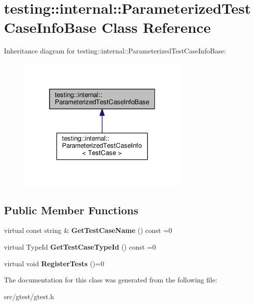 \hypertarget{classtesting_1_1internal_1_1_parameterized_test_case_info_base}{}\section{testing\+:\+:internal\+:\+:Parameterized\+Test\+Case\+Info\+Base Class Reference}
\label{classtesting_1_1internal_1_1_parameterized_test_case_info_base}


Inheritance diagram for testing\+:\+:internal\+:\+:Parameterized\+Test\+Case\+Info\+Base\+:
\nopagebreak
\begin{figure}[H]
\begin{center}
\leavevmode
\includegraphics[width=241pt]{classtesting_1_1internal_1_1_parameterized_test_case_info_base__inherit__graph}
\end{center}
\end{figure}
\subsection*{Public Member Functions}
\begin{DoxyCompactItemize}
\item 
\mbox{\label{classtesting_1_1internal_1_1_parameterized_test_case_info_base_a0c809cfb964cb9560d49ae830e2b6469}} 
virtual const string \& {\bfseries Get\+Test\+Case\+Name} () const =0
\item 
\mbox{\label{classtesting_1_1internal_1_1_parameterized_test_case_info_base_a932b4a9185a72d5bdfa5fd84fc06cbca}} 
virtual Type\+Id {\bfseries Get\+Test\+Case\+Type\+Id} () const =0
\item 
\mbox{\label{classtesting_1_1internal_1_1_parameterized_test_case_info_base_a92baca6c64c822c2e7043217f7903ef2}} 
virtual void {\bfseries Register\+Tests} ()=0
\end{DoxyCompactItemize}


The documentation for this class was generated from the following file\+:\begin{DoxyCompactItemize}
\item 
src/gtest/gtest.\+h\end{DoxyCompactItemize}
